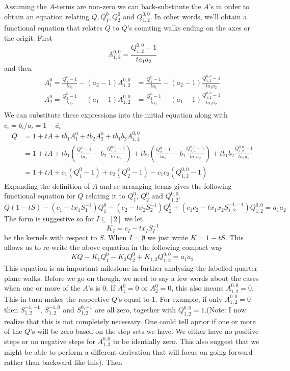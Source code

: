 \documentclass[12pt]{article}
\newcommand{\one}{\mathbb{I}}
\theoremstyle{definition} \newtheorem{definition}[theorem]{Definition}
\newcommand{\ol}[1]{\overline{#1}}
\newcommand{\Qf}[1]{Q_{1,2}^{#1}}
\newcommand{\Sf}[1]{S_{1,2}^{#1}}
\newcommand{\aye}[2]{A_{#1}^{#2}}
\begin{document}
Assuming the $A$-terms are non-zero we can back-substitute the $A$'s in order to obtain an equation relating $Q, Q_1^0, Q_2^0$ and $\Qf{0,0}$. In other words, we'll obtain a functional equation that relates $Q$ to $Q$'s counting walks ending on the axes or the origit. First
\[
	\aye{1,2}{0,0} = \frac{\Qf{0,0}-1}{ta_1a_2}
\]
and then
\begin{align*}
	A_1^0 = \frac{Q_1^0-1}{ta_1}-(a_2-1)\aye{1,2}{0,0} &= \frac{Q_1^0-1}{ta_1}-(a_2-1)\frac{\Qf{0,0}-1}{ta_1a_2}\\
	A_2^0 = \frac{Q_2^0-1}{ta_2}-(a_1-1)\aye{1,2}{0,0} &= \frac{Q_2^0-1}{ta_2}-(a_1-1)\frac{\Qf{0,0}-1}{ta_1a_2}\\
\end{align*}
We can substitute these expressions into the initial equation along with $c_i = b_i/a_i = 1-\ol{a_i}$
\begin{align*}
	Q &= 1+ tA + tb_1A_1^0+tb_2 A_2^0 + tb_1b_2 \aye{1,2}{0,0}\\
	    &= 1+ t A + tb_1\left(\frac{Q_1^0-1}{ta_1}-b_2\frac{\Qf{0,0}-1}{ta_1a_2}\right)+ tb_2\left(\frac{Q_2^0-1}{ta_2}-b_1\frac{\Qf{0,0}-1}{ta_1a_2}\right)+ tb_1b_2\frac{\Qf{0,0}-1}{ta_1a_2}\\
	    &= 1+ tA + c_1(Q_1^0-1)+c_2(Q_2^0-1)-c_1c_2(\Qf{0,0}-1)
\end{align*}
Expanding the definition of $A$ and re-arranging terms gives the following functional equation for $Q$ relating it to $Q_1^0$, $Q_2^0$ and $\Qf{0,0}$.
\[
	 Q(1-tS) - (c_1-t\ol{x_1}S_1^{-1})Q_1^0 - (c_2-t\ol{x_2}S_2^{-1})Q_2^0 + (c_1c_2-t\ol{x_1}\ol{x_2}\Sf{-1,-1})\Qf{0,0} = \ol{a_1 a_2}
\]
The form is suggestive so for $I\subseteq [2]$ we let
\[
	 K_I = c_I - t \ol{x_I}S_{I}^{-\one}
\]
 be the kernels with respect to $S$. When $I = \emptyset$ we just write $K = 1 - tS$. This allows us to re-write the above equation in the following compact way
\[
	   KQ - K_1 Q_1^0 - K_2 Q_2^0 + K_{1,2}Q_{1,2}^{0,0}= \ol{a_1a_2}
\]
This equation is an important milestone in further analysing the labelled quarter plane walks. Before we go on though, we need to say a few words about the cases when one or more of the $A$'s is 0. If $A_1^0 = 0$ or $A_2^0 = 0$, this also means $A_{1,2}^{0,0} = 0$. This in turn makes the respective $Q$'s equal to 1. For example, if only $A_{1,2}^{0,0} = 0$ then $\Sf{-1,-1}$, $\Sf{-1,0}$ and $\Sf{0,-1}$ are all zero, together with $Q_{1,2}^{0,0} = 1$.(Note: I now realize that this is not completely necessary. One could tell aprior if one or more of the $Q$'s will be zero based on the step sets we have. We either have no positive steps or no negative steps for $A_{1,2}^{0,0}$ to be identially zero. This also suggest that we might be able to perform a different derivation that will focus on going forward rather than backward like this). Then
\end{document}
